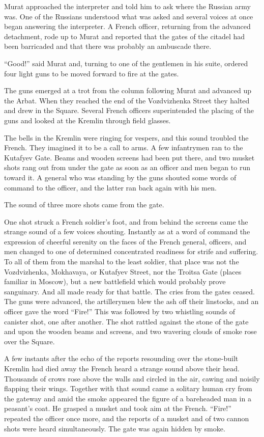 Murat approached the interpreter and told him to ask where the
Russian army was. One of the Russians understood what was asked
and several voices at once began answering the interpreter. A
French officer, returning from the advanced detachment, rode up
to Murat and reported that the gates of the citadel had been
barricaded and that there was probably an ambuscade there.

``Good!'' said Murat and, turning to one of the gentlemen in his
suite, ordered four light guns to be moved forward to fire at the
gates.

The guns emerged at a trot from the column following Murat and
advanced up the Arbat. When they reached the end of the
Vozdvizhenka Street they halted and drew in the Square. Several
French officers superintended the placing of the guns and looked
at the Kremlin through field glasses.

The bells in the Kremlin were ringing for vespers, and this sound
troubled the French. They imagined it to be a call to arms. A few
infantrymen ran to the Kutafyev Gate. Beams and wooden screens
had been put there, and two musket shots rang out from under the
gate as soon as an officer and men began to run toward it. A
general who was standing by the guns shouted some words of
command to the officer, and the latter ran back again with his
men.

The sound of three more shots came from the gate.

One shot struck a French soldier's foot, and from behind the
screens came the strange sound of a few voices
shouting. Instantly as at a word of command the expression of
cheerful serenity on the faces of the French general, officers,
and men changed to one of determined concentrated readiness for
strife and suffering. To all of them from the marshal to the
least soldier, that place was not the Vozdvizhenka, Mokhavaya, or
Kutafyev Street, nor the Troitsa Gate (places familiar in
Moscow), but a new battlefield which would probably prove
sanguinary.  And all made ready for that battle. The cries from
the gates ceased. The guns were advanced, the artillerymen blew
the ash off their linstocks, and an officer gave the word
``Fire!'' This was followed by two whistling sounds of canister
shot, one after another. The shot rattled against the stone of
the gate and upon the wooden beams and screens, and two wavering
clouds of smoke rose over the Square.

A few instants after the echo of the reports resounding over the
stone-built Kremlin had died away the French heard a strange
sound above their head. Thousands of crows rose above the walls
and circled in the air, cawing and noisily flapping their
wings. Together with that sound came a solitary human cry from
the gateway and amid the smoke appeared the figure of a
bareheaded man in a peasant's coat. He grasped a musket and took
aim at the French. ``Fire!'' repeated the officer once more, and
the reports of a musket and of two cannon shots were heard
simultaneously.  The gate was again hidden by smoke.

